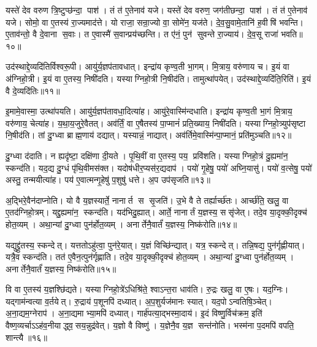यस्ते॑ देव वरुण त्रि॒ष्टुप्छ॑न्दा॒ पाश॑।
तं त॑ ए॒तेनाव॑ यजे।
यस्ते॑ देव वरुण॒ जग॑तीछन्दा॒ पाश॑।
तं त॑ ए॒तेनाव॑ यजे।
सोमो॒ वा ए॒तस्य॑ रा॒ज्यमाद॑त्ते।
यो राजा॒ सन्रा॒ज्यो वा॒ सोमे॑न॒ यज॑ते।
दे॒व॒सु॒वामे॒तानि॑ ह॒वीषि॑ भवन्ति।
ए॒ताव॑न्तो॒ वै दे॒वाना स॒वाः।
त ए॒वास्मै॑ स॒वान्प्रय॑च्छन्ति।
त ए॑नं॒ पुन॑ सुवन्ते रा॒ज्याय॑।
दे॒व॒सू राजा॑ भवति॥१०॥\anuvakamend[सोम॑ आवि॒शन् य॑जे रा॒ज्यायैकं॑ च]

उद॑स्थाद्दे॒व्यदि॑तिर्विश्वरू॒पी।
आयु॑र्य॒ज्ञप॑तावधात्।
इन्द्रा॑य कृण्व॒ती भा॒गम्।
मि॒त्राय॒ वरु॑णाय च।
इ॒यं वा अ॑ग्निहो॒त्री।
इ॒यं वा ए॒तस्य॒ निषी॑दति।
यस्याग्निहो॒त्री नि॒षीद॑ति।
तामुत्था॑पयेत्।
उद॑स्थाद्दे॒व्यदि॑ति॒रिति॑।
इ॒यं वै दे॒व्यदि॑तिः॥११॥

इ॒मामे॒वास्मा॒ उत्था॑पयति।
आयु॑र्य॒ज्ञप॑तावधा॒दित्या॑ह।
आयु॑रे॒वास्मि॑न्दधाति।
इन्द्रा॑य कृण्व॒ती भा॒गं मि॒त्राय॒ वरु॑णाय॒ चेत्या॑ह।
य॒था॒य॒जुरे॒वैतत्।
अव॑र्तिं॒ वा ए॒षैतस्य॑ पा॒प्मानं॑ प्रति॒ख्याय॒ निषी॑दति।
यस्याग्निहो॒त्र्युप॑सृष्टा नि॒षीद॑ति।
तां दु॒ग्ध्वा ब्राह्म॒णाय॑ दद्यात्।
यस्यान्नं॒ नाद्यात्।
अव॑र्तिमे॒वास्मि॑न्पा॒प्मानं॒ प्रति॑मुञ्चति॥१२॥

दु॒ग्ध्वा द॑दाति।
न ह्यदृ॑ष्टा॒ दक्षि॑णा दी॒यते।
पृ॒थि॒वीं वा ए॒तस्य॒ पय॒ प्रवि॑शति।
यस्याग्निहो॒त्रं दु॒ह्यमा॑न॒ स्कन्द॑ति।
यद॒द्य दु॒ग्धं पृ॑थि॒वीमस॑क्त।
यदोष॑धीर॒प्यस॑र॒द्यदाप॑।
पयो॑ गृ॒हेषु॒ पयो॑ अघ्नि॒यासु॑।
पयो॑ व॒त्सेषु॒ पयो॑ अस्तु॒ तन्मयीत्या॑ह।
पय॑ ए॒वात्मन्गृ॒हेषु॑ प॒शुषु॑ धत्ते।
अ॒प उप॑सृजति॥१३॥

अ॒द्भिरे॒वैन॑दाप्नोति।
यो वै य॒ज्ञस्यार्ते॒ नानार्त स सृ॒जति॑।
उ॒भे वै ते तर्ह्यार्च्छ॑तः।
आर्च्छ॑ति॒ खलु॒ वा ए॒तद॑ग्निहो॒त्रम्।
यद्दु॒ह्यमा॑न॒ स्कन्द॑ति।
यद॑भिदु॒ह्यात्।
आर्ते॒ नानार्तं य॒ज्ञस्य॒ ससृ॑जेत्।
तदे॒व या॒दृक्की॒दृक्च॑ होत॒व्यम्।
अथा॒न्यां दु॒ग्ध्वा पुन॑र्\mbox{}होत॒व्यम्।
अनार्तेनै॒वार्तं॑ य॒ज्ञस्य॒ निष्क॑रोति॥१४॥

यद्युद्द्रु॑तस्य॒ स्कन्देत्।
यत्ततोऽहु॑त्वा॒ पुन॑रे॒यात्।
य॒ज्ञं विच्छि॑न्द्यात्।
यत्र॒ स्कन्देत्।
तन्नि॒षद्य॒ पुन॑र्गृह्णीयात्।
यत्रै॒व स्कन्द॑ति।
तत॑ ए॒वैन॒त्पुन॑र्गृह्णाति।
तदे॒व या॒दृक्की॒दृक्च॑ होत॒व्यम्।
अथा॒न्यां दु॒ग्ध्वा पुन॑र्\mbox{}होत॒व्यम्।
अनार्तेनै॒वार्तं॑ य॒ज्ञस्य॒ निष्क॑रोति॥१५॥

वि वा ए॒तस्य॑ य॒ज्ञश्छि॑द्यते।
यस्याग्निहो॒त्रे॑ऽधिश्रि॑ते॒ श्वाऽन्त॒रा धाव॑ति।
रु॒द्रः खलु॒ वा ए॒षः।
यद॒ग्निः।
यद्गाम॑न्वत्या व॒र्तयेत्।
रु॒द्राय॑ प॒शूनपि॑ दध्यात्।
अ॒प॒शुर्यज॑मानः स्यात्।
यद॒पोऽन्वतिषि॒ञ्चेत्।
अ॒ना॒द्यम॒ग्नेराप॑।
अ॒ना॒द्यमाभ्या॒मपि॑ दध्यात्।
गार्\mbox{}ह॑पत्या॒द्भस्मा॒दाय॑।
इ॒दं विष्णु॒र्विच॑क्रम॒ इति॑ वैष्ण॒व्यर्चाऽऽह॑व॒नीयाद्ध्व॒सय॒न्नुद्र॑वेत्।
य॒ज्ञो वै विष्णु॑।
य॒ज्ञेनै॒व य॒ज्ञ सन्त॑नोति।
भस्म॑ना प॒दमपि॑ वपति॒ शान्त्यै॥१६॥\anuvakamend[वै दे॒व्यदि॑तिर्मुञ्चति सृजति करोति करोत्याभ्या॒मपि॑ दध्या॒त् पञ्च॑ च]

